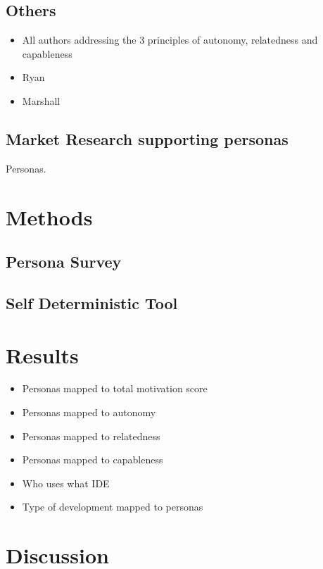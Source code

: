 \documentclass[conference]{IEEEtran}
\begin{document}
\subsection{Others}

\begin{itemize}
\item
  All authors addressing the 3 principles of autonomy, relatedness and
  capableness
\item
  Ryan
\item
  Marshall
\end{itemize}

\subsection{Market Research supporting personas}

Personas.

\section{Methods}

\subsection{Persona Survey}

\subsection{Self Deterministic Tool}

\section{Results}

\begin{itemize}
\item
  Personas mapped to total motivation score
\item
  Personas mapped to autonomy
\item
  Personas mapped to relatedness
\item
  Personas mapped to capableness
\item
  Who uses what IDE
\item
  Type of development mapped to personas
\end{itemize}

\section{Discussion}
\end{document}
